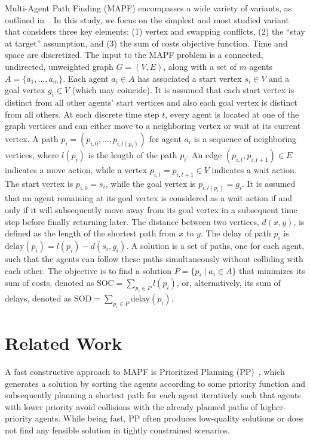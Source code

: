 \documentclass[runningheads]{llncs}
\begin{document}
Multi-Agent Path Finding (MAPF) encompasses a wide variety of variants, as outlined in~\cite{stern-2019}. In this study, we focus on the simplest and most studied variant that considers three key elements: (1) vertex and swapping conflicts, (2) the ``stay at target'' assumption, and (3) the sum of costs objective function. Time and space are discretized.  The input to the MAPF problem is a connected, undirected, unweighted graph $G=(V,E)$, along with a set of $m$ agents $A=\{a_1, \ldots , a_m \}$. Each agent $a_i \in A$ has associated a start vertex $s_i \in V$ and a goal vertex $g_i \in V$ (which may coincide). It is assumed that each start vertex is distinct from all other agents' start vertices and also each goal vertex is distinct from all others. At each discrete time step $t$, every agent is located at one of the graph vertices and can either move to a neighboring vertex or wait at its current vertex. A path $p_i = (p_{i,0}, \ldots , p_{i,l(p_i)})$ for agent $a_i$ is a sequence of neighboring vertices, where $l(p_i)$ is the length of the path $p_i$. An edge $(p_{i,t},p_{i,t+1}) \in E$ indicates a move action, while a vertex $p_{i,t} = p_{i,t+1} \in V$ indicates a wait action. The start vertex is $p_{i,0} = s_i$, while the goal vertex is $p_{i,l(p_i)} = g_i$. It is assumed that an agent remaining at its goal vertex is considered as a wait action if and only if it will subsequently move away from its goal vertex in a subsequent time step before finally returning later. The distance between two vertices, $d(x,y)$, is defined as the length of the shortest path from $x$ to $y$. The delay of path $p_i$ is $\mathrm{delay}(p_i) = l(p_i) - d(s_i,g_i)$. A solution is a set of paths, one for each agent, such that the agents can follow these paths simultaneously without colliding with each other. The objective is to find a solution $P = \{p_i \; | \; a_i \in A \}$ that minimizes its sum of costs, denoted as $\mathrm{SOC}=\sum_{p_i \in P} l(p_i)$, or, alternatively, its sum of delays, denoted as $\mathrm{SOD}=\sum_{p_i \in P} \mathrm{delay}(p_i)$. 


\section{Related Work} \label{sec:related-work}

A fast constructive approach to MAPF is Prioritized Planning (PP)~\cite{silver-2005}, which generates a solution by sorting the agents according to some priority function and subsequently planning a shortest path for each agent iteratively such that agents with lower priority avoid collisions with the already planned paths of higher-priority agents. While being fast, PP often produces low-quality solutions or does not find any feasible solution in tightly constrained scenarios.
\end{document}
